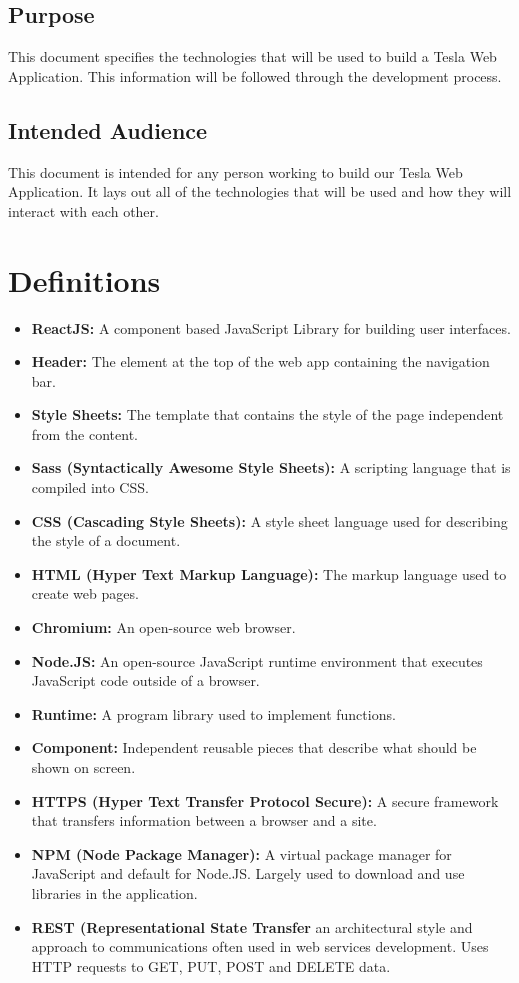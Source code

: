 \documentclass[onecolumn, draftclsnofoot,10pt, compsoc]{IEEEtran}
\begin{document}
    \subsection{Purpose}
        This document specifies the technologies that will be used to build a Tesla Web Application. This information will be followed through the development process.
        
    \subsection{Intended Audience}
        This document is intended for any person working to build our Tesla Web Application. It lays out all of the technologies that will be used and how they will interact with each other. 

\section{Definitions}
\begin{itemize}
    \item \textbf{ReactJS:} A component based JavaScript Library for building user interfaces. 
    \item \textbf{Header:} The element at the top of the web app containing the navigation bar.
    \item \textbf{Style Sheets:} The template that contains the style of the page independent from the content.
    \item \textbf{Sass (Syntactically Awesome Style Sheets):} A scripting language that is compiled into CSS.
    \item \textbf{CSS (Cascading Style Sheets):} A style sheet language used for describing the style of a document.
    \item \textbf{HTML (Hyper Text Markup Language):} The markup language used to create web pages.
    \item \textbf{Chromium:} An open-source web browser.
    \item \textbf{Node.JS:} An open-source JavaScript runtime environment that executes JavaScript code outside of a browser.
    \item \textbf{Runtime:} A program library used to implement functions.
    \item \textbf{Component:} Independent reusable pieces that describe what should be shown on screen.
    \item \textbf{HTTPS (Hyper Text Transfer Protocol Secure):} A secure framework that transfers information between a browser and a site. 
    \item \textbf{NPM (Node Package Manager):} A virtual package manager for JavaScript and default for Node.JS. Largely used to download and use libraries in the application. 
    \item \textbf{REST (Representational State Transfer} an architectural style and approach to communications often used in web services development. Uses HTTP requests to GET, PUT, POST and DELETE data.
\end{itemize}
    
\end{document}
